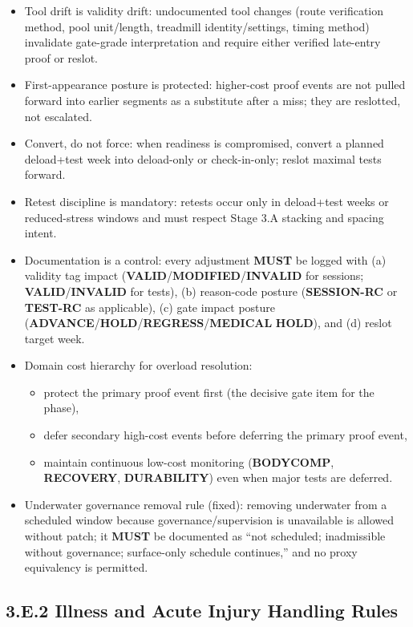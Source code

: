 \documentclass[10pt]{article}
\begin{document}
\begin{itemize}
\item Tool drift is validity drift: undocumented tool changes (route verification method, pool unit/length, treadmill identity/settings, timing method) invalidate gate-grade interpretation and require either verified late-entry proof or reslot.
\item First-appearance posture is protected: higher-cost proof events are not pulled forward into earlier segments as a substitute after a miss; they are reslotted, not escalated.
\item Convert, do not force: when readiness is compromised, convert a planned deload+test week into deload-only or check-in-only; reslot maximal tests forward.
\item Retest discipline is mandatory: retests occur only in deload+test weeks or reduced-stress windows and must respect Stage 3.A stacking and spacing intent.
\item Documentation is a control: every adjustment \textbf{MUST} be logged with (a) validity tag impact (\textbf{VALID}/\textbf{MODIFIED}/\textbf{INVALID} for sessions; \textbf{VALID}/\textbf{INVALID} for tests), (b) reason-code posture (\textbf{SESSION-RC} or \textbf{TEST-RC} as applicable), (c) gate impact posture (\textbf{ADVANCE}/\textbf{HOLD}/\textbf{REGRESS}/\textbf{MEDICAL} \textbf{HOLD}), and (d) reslot target week.
\item Domain cost hierarchy for overload resolution:
\begin{itemize}
\item protect the primary proof event first (the decisive gate item for the phase),
\item defer secondary high-cost events before deferring the primary proof event,
\item maintain continuous low-cost monitoring (\textbf{BODYCOMP}, \textbf{RECOVERY}, \textbf{DURABILITY}) even when major tests are deferred.
\end{itemize}
\item Underwater governance removal rule (fixed): removing underwater from a scheduled window because governance/supervision is unavailable is allowed without patch; it \textbf{MUST} be documented as “not scheduled; inadmissible without governance; surface-only schedule continues,” and no proxy equivalency is permitted.
\end{itemize}

\subsection*{3.E.2 Illness and Acute Injury Handling Rules}
{}
\end{document}

